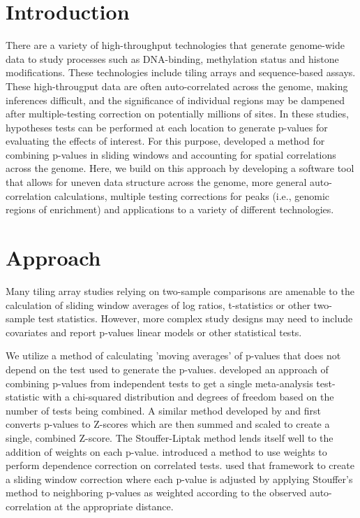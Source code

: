 \documentclass{bioinfo}
\begin{document}
\section{Introduction}
There are a variety of high-throughput technologies that generate
genome-wide data to study processes such as DNA-binding, methylation
status and histone modifications. These technologies include tiling
arrays and sequence-based assays. These high-througput data
are often auto-correlated across
the genome, making inferences difficult, and the significance of
individual regions may be dampened after multiple-testing correction
on potentially millions of sites.
In these studies, hypotheses tests can be performed at each location to
generate p-values for evaluating the effects of interest. For this
purpose, \cite{Kechris2010} developed a method for combining p-values
in sliding windows and accounting for spatial correlations across the
genome. Here, we build on this approach by developing a software tool
that allows for uneven data structure across the genome, more general
auto-correlation calculations, multiple testing corrections for peaks
(i.e., genomic regions of enrichment) and applications to a variety of
different technologies.

\section{Approach}
Many tiling array studies relying on two-sample comparisons are
amenable to the calculation of sliding window averages of log ratios,
t-statistics or other two-sample test statistics. However,
more complex study designs may need to include covariates and report
p-values linear models or other statistical tests.

We utilize a method of calculating 'moving averages' of p-values
that does not depend on the
test used to generate the p-values. \cite{Fisher} developed an
approach of combining p-values from independent tests to get a single
meta-analysis test-statistic with a chi-squared distribution and
degrees of freedom based on the number of tests being combined.  A
similar method developed by \cite{Stouffer} and \cite{Liptak} first
converts p-values to Z-scores which are then summed and scaled to create a single, combined
Z-score.  The Stouffer-Liptak method lends itself well to the addition of
weights on each p-value. \cite{Zaykin2002} introduced a
method to use weights to perform dependence correction on correlated
tests. \cite{Kechris2010} used that framework to create a sliding
window correction where each p-value is adjusted by applying
Stouffer's method to neighboring p-values as weighted according to the
observed auto-correlation at the appropriate distance.
\end{document}

